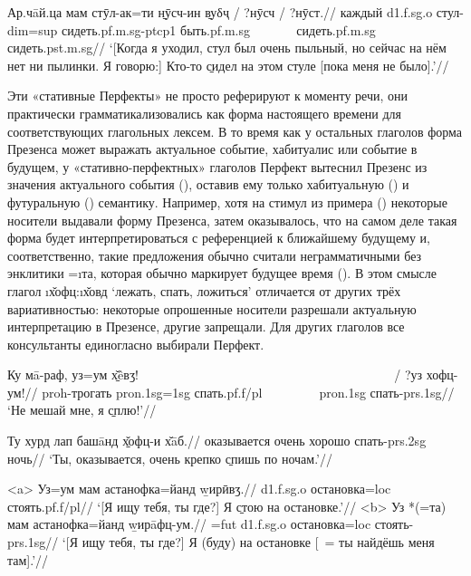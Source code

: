 {{{
\begingl
\gla Ар.чāй.ца мам стӯл-ак=ти \b{нӯсч-ин} \b{вуδҷ} / ?нӯсч / ?нӯст.//
\glc каждый {\sc d1.f.sg.o} стул-{\sc dim=sup} сидеть.{\sc pf.m.sg-ptcp1} быть.{\sc pf.m.sg} ~~~~~~ сидеть.{\sc pf.m.sg} ~~~~~~ сидеть.{\sc pst.m.sg}//
\glft ‘[Когда я уходил, стул был очень пыльный, но сейчас на нём нет ни пылинки. Я говорю:] Кто-то \b{сидел} на этом стуле [пока меня не было].’//
\endgl \xe

Эти «стативные Перфекты» не просто реферируют к моменту речи, они практически грамматикализовались как форма настоящего времени для соответствующих глагольных лексем. В то время как у остальных глаголов форма Презенса может выражать актуальное событие, хабитуалис или событие в будущем, у «стативно-перфектных» глаголов Перфект вытеснил Презенс из значения актуального события (), оставив ему только хабитуальную () и футуральную () семантику. Например, хотя на стимул из примера () некоторые носители выдавали форму Презенса, затем оказывалось, что на самом деле такая форма будет интерпретироваться с референцией к ближайшему будущему и, соответственно, такие предложения обычно считали неграмматичными без энклитики =\i{та}, которая обычно маркирует будущее время (). В этом смысле глагол \i{х̌офц}:\i{х̌овд} ‘лежать, спать, ложиться’ отличается от других трёх вариативностью: некоторые опрошенные носители разрешали актуальную интерпретацию в Презенсе, другие запрещали. Для других глаголов все консультанты единогласно выбирали Перфект.

\begingl
\gla Ку мā-раф, уз=ум \b{х̌êвӡ}! ~~~~~~~~~~~~~~~~~~~~~~~~~~~~~~~~~~~~~~~ / ?уз хофц-ум!//
 {\sc proh}-трогать {\sc pron.1sg=1sg} спать.{\sc pf.f/pl} ~ ~~~~~~ {\sc pron.1sg} спать-{\sc prs.1sg}//
\glft ‘Не мешай мне, я \b{сплю}!’//
\endgl \xe

\begingl
\gla Ту хурд лап башāнд \b{х̌офц-и} х̌āб.//
 оказывается очень хорошо спать-{\sc prs.2sg} ночь//
\glft ‘Ты, оказывается, очень крепко \b{спишь} по ночам.’//
\endgl \xe

\a<a> \begingl
\gla Уз=ум мам астанофка=йанд \b{wирӣвӡ}.//
 {\sc d1.f.sg.o} остановка={\sc loc} стоять.{\sc pf.f/pl}//
\glft ‘[Я ищу тебя, ты где?] Я \b{стою} на остановке.’//
\endgl
\a<b> \begingl
\gla Уз *(=та) мам астанофка=йанд \b{wирāфц-ум}.//
 ={\sc fut} {\sc d1.f.sg.o} остановка={\sc loc} стоять-{\sc prs.1sg}//
\glft ‘[Я ищу тебя, ты где?] Я (буду) на остановке [~= ты найдёшь меня там].’//
\endgl \xe

}}}
